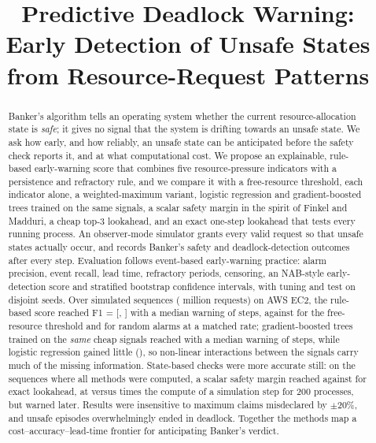 \documentclass[conference]{IEEEtran}
\begin{document}
\title{Predictive Deadlock Warning: Early Detection of Unsafe States from Resource-Request Patterns}

\author{
}

\maketitle

\begin{abstract}
Banker's algorithm tells an operating system whether the current resource-allocation state is \emph{safe}; it gives no signal that the system is drifting towards an unsafe state. We ask how early, and how reliably, an unsafe state can be anticipated before the safety check reports it, and at what computational cost. We propose an explainable, rule-based early-warning score that combines five resource-pressure indicators with a persistence and refractory rule, and we compare it with a free-resource threshold, each indicator alone, a weighted-maximum variant, logistic regression and gradient-boosted trees trained on the same signals, a scalar safety margin in the spirit of Finkel and Madduri, a cheap top-3 lookahead, and an exact one-step lookahead that tests every running process. An observer-mode simulator grants every valid request so that unsafe states actually occur, and records Banker's safety and deadlock-detection outcomes after every step. Evaluation follows event-based early-warning practice: alarm precision, event recall, lead time, refractory periods, censoring, an NAB-style early-detection score and stratified bootstrap confidence intervals, with tuning and test on disjoint seeds. Over \NSeqAll{} simulated sequences (\NStepsAllM{} million requests) on AWS EC2, the rule-based score reached F1 = \CombF{} [\CombFlo, \CombFhi] with a median warning of \CombLead{} steps, against \AvailF{} for the free-resource threshold and \RandF{} for random alarms at a matched rate; gradient-boosted trees trained on the \emph{same} cheap signals reached \GbtF{} with a median warning of \GbtLead{} steps, while logistic regression gained little (\LrF), so non-linear interactions between the signals carry much of the missing information. State-based checks were more accurate still: on the sequences where all methods were computed, a scalar safety margin reached \MargFsub{} against \LookFsub{} for exact lookahead, at \MargCostMaxN{} versus \LookCostMaxN{} times the compute of a simulation step for 200 processes, but warned later. Results were insensitive to maximum claims misdeclared by $\pm$20\%, and unsafe episodes overwhelmingly ended in deadlock. Together the methods map a cost--accuracy--lead-time frontier for anticipating Banker's verdict.
\end{abstract}
\end{document}
